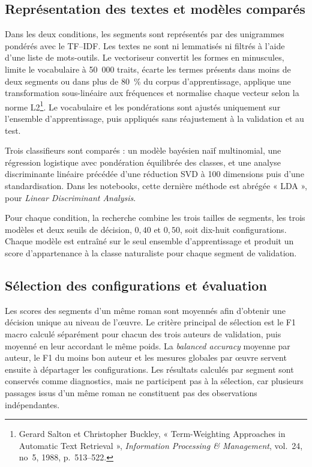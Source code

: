 \subsection{Représentation des textes et modèles comparés}

Dans les deux conditions, les segments sont représentés par des unigrammes pondérés avec le TF--IDF. Les textes ne sont ni lemmatisés ni filtrés à l'aide d'une liste de mots-outils. Le vectoriseur convertit les formes en minuscules, limite le vocabulaire à 50~000 traits, écarte les termes présents dans moins de deux segments ou dans plus de 80~\% du corpus d'apprentissage, applique une transformation sous-linéaire aux fréquences et normalise chaque vecteur selon la norme L2\footnote{Gerard Salton et Christopher Buckley, « Term-Weighting Approaches in Automatic Text Retrieval », \textit{Information Processing \& Management}, vol.~24, no~5, 1988, p.~513--522.}. Le vocabulaire et les pondérations sont ajustés uniquement sur l'ensemble d'apprentissage, puis appliqués sans réajustement à la validation et au test.

Trois classifieurs sont comparés : un modèle bayésien naïf multinomial, une régression logistique avec pondération équilibrée des classes, et une analyse discriminante linéaire précédée d'une réduction SVD à 100 dimensions puis d'une standardisation. Dans les notebooks, cette dernière méthode est abrégée « LDA », pour \textit{Linear Discriminant Analysis}. 

Pour chaque condition, la recherche combine les trois tailles de segments, les trois modèles et deux seuils de décision, $0{,}40$ et $0{,}50$, soit dix-huit configurations. Chaque modèle est entraîné sur le seul ensemble d'apprentissage et produit un score d'appartenance à la classe naturaliste pour chaque segment de validation.

\subsection{Sélection des configurations et évaluation}

Les scores des segments d'un même roman sont moyennés afin d'obtenir une décision unique au niveau de l'œuvre. Le critère principal de sélection est le F1 macro calculé séparément pour chacun des trois auteurs de validation, puis moyenné en leur accordant le même poids. La \textit{balanced accuracy} moyenne par auteur, le F1 du moins bon auteur et les mesures globales par œuvre servent ensuite à départager les configurations. Les résultats calculés par segment sont conservés comme diagnostics, mais ne participent pas à la sélection, car plusieurs passages issus d'un même roman ne constituent pas des observations indépendantes.

